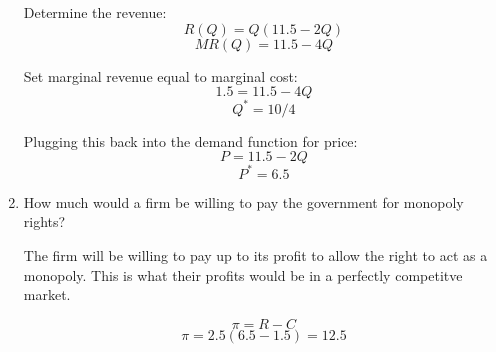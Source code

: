 \documentclass{article}
\begin{document}
\begin{enumerate}[1.]
        Determine the revenue:
        $$ R( Q ) = Q( 11.5 - 2Q ) $$
        $$ MR( Q ) = 11.5 - 4Q $$

        Set marginal revenue equal to marginal cost:
        $$ 1.5 = 11.5 - 4Q $$
        $$ Q^{*} = 10/4 $$

        Plugging this back into the demand function for price:
        $$ P = 11.5 - 2Q  $$
        $$ P^{*} = 6.5 $$

    \item How much would a firm be willing to pay the government for monopoly
        rights?

        The firm will be willing to pay up to its profit to allow the right to
        act as a monopoly. This is what their profits would be in a perfectly
        competitve market. 

        $$ \pi = R - C $$
        $$ \pi = 2.5 ( 6.5 - 1.5 ) = 12.5 $$
\end{enumerate}
\end{document}
